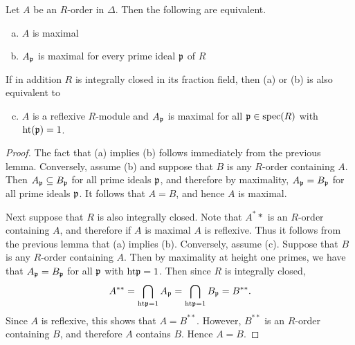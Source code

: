 \begin{cor}
Let $A$ be an $R$-order in $\Delta$.  Then the following are equivalent.
\begin{enumerate}[(a)]
\item  $A$ is maximal
\item  $A_{\mathfrak{p}}$ is maximal for every prime ideal $\mathfrak{p}$ of $R$
\end{enumerate}
If in addition $R$ is integrally closed in its fraction field, then (a) or (b) is also equivalent to
\begin{enumerate}[(a)]
\setcounter{enumi}{2}
\item  $A$ is a reflexive $R$-module and $A_{\mathfrak{p}}$ is maximal for all $\mathfrak{p}\in\textnormal{spec}(R)$ with $\textnormal{ht}(\mathfrak{p})=1$.
\end{enumerate}
\end{cor}
\begin{proof}
The fact that (a) implies (b) follows immediately from the previous lemma.  Conversely, assume (b) and suppose that $B$ is any $R$-order containing $A$.  Then $A_{\mathfrak{p}}\subseteq B_{\mathfrak{p}}$ for all prime ideals $\mathfrak{p}$, and therefore by maximality, $A_{\mathfrak{p}} = B_{\mathfrak{p}}$ for all prime ideals $\mathfrak{p}$.  It follows that $A = B$, and hence $A$ is maximal.

Next suppose that $R$ is also integrally closed.  Note that $A^**$ is an $R$-order containing $A$, and therefore if $A$ is maximal $A$ is reflexive.  Thus it follows from the previous lemma that (a) implies (b).  Conversely, assume (c).  Suppose that $B$ is any $R$-order containing $A$.  Then by maximality at height one primes, we have that $A_{\mathfrak{p}} = B_{\mathfrak{p}}$ for all $\mathfrak{p}$ with $\textnormal{ht}\mathfrak{p} = 1$.  Then since $R$ is integrally closed,
$$A^{**} = \bigcap_{\textnormal{ht}\mathfrak{p} = 1} A_{\mathfrak{p}} = \bigcap_{\textnormal{ht}\mathfrak{p} = 1} B_{\mathfrak{p}} = B^{**}.$$
Since $A$ is reflexive, this shows that $A = B^{**}$.  However, $B^{**}$ is an $R$-order containing $B$, and therefore $A$ contains $B$.  Hence $A = B$.
\end{proof}

